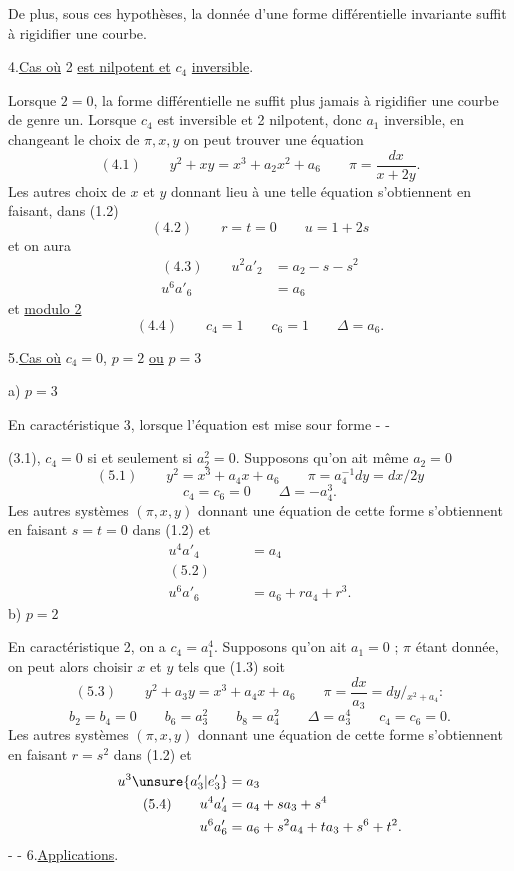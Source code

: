 De plus, sous ces hypothèses, la donnée d'une forme différentielle invariante suffit à rigidifier une courbe.

4.\quad \uline{Cas où} 2 \uline{est nilpotent et} $c_4$ \uline{inversible}.

Lorsque $2=0$, la forme différentielle ne suffit plus jamais à rigidifier une courbe de genre un. Lorsque $c_4$ est inversible et 2 nilpotent, donc $a_1$ inversible, en changeant le choix de $\pi,x,y$ on peut trouver une équation
\[
(4.1)\qquad y^2+xy=x^3+a_2x^2+a_6\qquad\pi=\frac{dx}{x+2y}.
\]
Les autres choix de $x$ et $y$ donnant lieu à une telle équation s'obtiennent en faisant, dans (1.2)
\[
(4.2)\qquad r=t=0\qquad u=1+2s
\]
et on aura
\[
\begin{aligned}
(4.3)\qquad u^2a'_2&=a_2-s-s^2\\
u^6a'_6&=a_6
\end{aligned}
\]
et \uline{modulo 2}
\[
(4.4)\qquad c_4=1\qquad c_6=1\qquad\Delta=a_6.
\]

5.\quad \uline{Cas où} $c_4=0$, $p=2$ \uline{ou} $p=3$

a) $p=3$

En caractéristique 3, lorsque l'équation est mise sour forme
-  -

(3.1), $c_4=0$ si et seulement si $a_2^2=0$. Supposons qu'on ait même $a_2=0$
\[
(5.1)\qquad y^2=x^3+a_4x+a_6\qquad\pi=a_4^{-1}dy=dx/2y
\]
\[
c_4=c_6=0\qquad\Delta=-a_4^3.
\]
Les autres systèmes $(\pi,x,y)$ donnant une équation de cette forme s'obtiennent en faisant $s=t=0$ dans (1.2) et
\[
\begin{aligned}
u^4a'_4&=a_4\\
(5.2)\qquad&\\
u^6a'_6&=a_6+ra_4+r^3.
\end{aligned}
\]
b) $p=2$

En caractéristique 2, on a $c_4=a_1^4$. Supposons qu'on ait $a_1=0$ ; $\pi$ étant donnée, on peut alors choisir $x$ et $y$ tels que (1.3) soit
\[
(5.3)\qquad y^2+a_3y=x^3+a_4x+a_6\qquad\pi=\frac{dx}{a_3}=dy/{}_{x^2+a_4}:
\]
\[
b_2=b_4=0\qquad b_6=a_3^2\qquad b_8=a_4^2\qquad\Delta=a_3^4\qquad c_4=c_6=0.
\]
Les autres systèmes $(\pi,x,y)$ donnant une équation de cette forme s'obtiennent en faisant $r=s^2$ dans (1.2) et
\[
\begin{aligned}
u^3\unsure{a'_3|e'_3}&=a_3\\
(5.4)\qquad u^4a'_4&=a_4+sa_3+s^4\\
u^6a'_6&=a_6+s^2a_4+ta_3+s^6+t^2.
\end{aligned}
\]
-  -
6.\quad \uline{Applications}.


